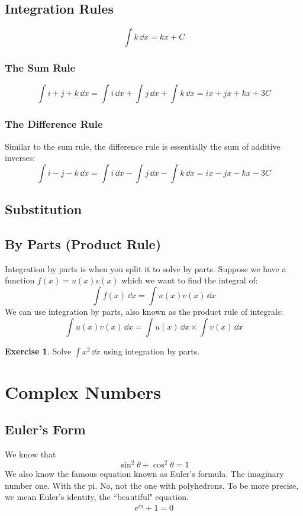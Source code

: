 \documentclass[a4paper]{article}
\theoremstyle{definition}
\newtheorem{exercise}{Exercise}[section]
\newcommand{\sectionSpace}{\vspace{2em}} %
\newcommand{\subsectionSpace}{\vspace{0.5em}}
\begin{document}
    \subsection{Integration Rules}
    $$\int k\,\dd{x} = kx + C$$
        \subsubsection{The Sum Rule}
        $$\int i + j + k\,\dd{x} = \int i\,\dd{x} + \int j\,\dd{x} + \int k\,\dd{x} = ix + jx + kx + 3C$$

        \subsubsection{The Difference Rule}
        Similar to the sum rule, the difference rule is essentially the sum of additive inverses:
        $$\int i - j - k\,\dd{x} = \int i\,\dd{x} - \int j\,\dd{x} - \int k\,\dd{x} = ix - jx - kx - 3C$$

    \subsectionSpace
    \subsection{Substitution}
    
    \subsectionSpace
    \subsection{By Parts (Product Rule)}
    Integration by parts is when you split it to solve by parts. Suppose we have a function $f(x) = u(x)v(x)$ which we want to find the integral of:
    $$\int f(x) \,\dd{x} = \int u(x)v(x) \,\dd{x}$$
    We can use integration by parts, also known as the product rule of integrals:
    $$\int u(x)v(x)\,\dd{x} = \int u(x)\,\dd{x}\times \int v(x)\,\dd{x}$$

    \begin{exercise}
        Solve $\int x^2\,\dd{x}$ using integration by parts.
    \end{exercise}



\sectionSpace
\section{Complex Numbers}
    \subsection{Euler's Form}
    We know that
    $$\sin^2\theta + \cos^2\theta = 1$$
    We also know the famous equation known as Euler's formula. The imaginary number one. With the pi. No, not the one with polyhedrons. To be more precise, we mean Euler's identity, the ``beautiful" equation.
    $$e^{i\pi} + 1 = 0$$
\end{document}
